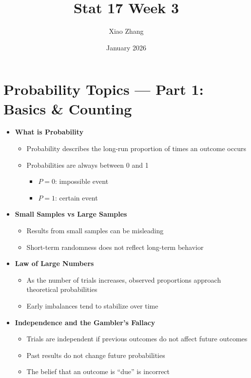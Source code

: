 \documentclass{article}
\title{Stat 17 Week 3}
\author{Xiao Zhang}
\date{January 2026}
\begin{document}
\maketitle

\section*{Probability Topics — Part 1: Basics \& Counting}

\begin{itemize}
  \item \textbf{What is Probability}
  \begin{itemize}
    \item Probability describes the long-run proportion of times an outcome occurs
    \item Probabilities are always between 0 and 1
    \begin{itemize}
      \item $P=0$: impossible event
      \item $P=1$: certain event
    \end{itemize}
  \end{itemize}

  \item \textbf{Small Samples vs Large Samples}
  \begin{itemize}
    \item Results from small samples can be misleading
    \item Short-term randomness does not reflect long-term behavior
  \end{itemize}

  \item \textbf{Law of Large Numbers}
  \begin{itemize}
    \item As the number of trials increases, observed proportions approach theoretical probabilities
    \item Early imbalances tend to stabilize over time
  \end{itemize}

  \item \textbf{Independence and the Gambler's Fallacy}
  \begin{itemize}
    \item Trials are independent if previous outcomes do not affect future outcomes
    \item Past results do not change future probabilities
    \item The belief that an outcome is ``due'' is incorrect
  \end{itemize}


\end{itemize}
\end{document}
